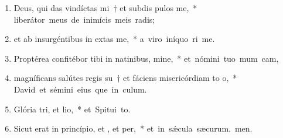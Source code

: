\begin{flushleft}
\begin{enumerate}[leftmargin=*]
\item Deus, qui das vindíctas mi~† et subdis pulos  me,~* \mbox{liberátor meus de inimícis meis radis;}

\item et ab insurgéntibus in  extas me,~* \mbox{a viro iníquo ri me.}

\item Proptérea confitébor tibi in natinibus, mine,~* \mbox{et nómini tuo mum cam,}

\item magníficans salútes regis su~† et fáciens misericórdiam to o,~* \mbox{David et sémini eius que in culum.}

\item Glória tri, et lio,~* \mbox{et Spitui to.}

\item Sicut erat in princípio, et , et per,~* \mbox{et in s\'{\ae}cula sæcurum. men.}

\end{enumerate}
\end{flushleft}

